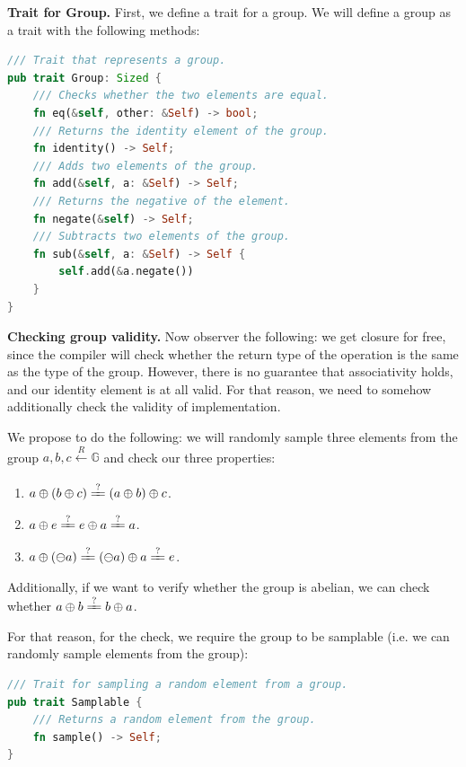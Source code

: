 \documentclass[../lecture-notes.tex]{subfiles}
\begin{document}
\textbf{Trait for Group.} First, we define a trait for a group. We will define a group as a trait with the following methods:
\begin{lstlisting}[language=Rust]
/// Trait that represents a group.
pub trait Group: Sized {
    /// Checks whether the two elements are equal.
    fn eq(&self, other: &Self) -> bool;
    /// Returns the identity element of the group.
    fn identity() -> Self;
    /// Adds two elements of the group.
    fn add(&self, a: &Self) -> Self;
    /// Returns the negative of the element.
    fn negate(&self) -> Self;
    /// Subtracts two elements of the group.
    fn sub(&self, a: &Self) -> Self {
        self.add(&a.negate())
    }
}
\end{lstlisting}

\textbf{Checking group validity.} Now observer the following: we get closure for free, since the compiler will check whether the return type of the operation is the same as the type of the group. 
However, there is no guarantee that associativity holds, and our identity element is at all valid. For that reason, we need to somehow additionally check the
validity of implementation.

We propose to do the following: we will randomly sample three elements from the group $a,b,c \xleftarrow[]{R} \mathbb{G}$ and check our three properties:
\begin{enumerate}
    \item $a \oplus (b \oplus c) \xlongequal{?} (a \oplus b) \oplus c$.
    \item $a \oplus e \xlongequal{?} e \oplus a \xlongequal{?} a $.
    \item $a \oplus (\ominus a) \xlongequal{?} (\ominus a) \oplus a \xlongequal{?} e$.
\end{enumerate}

Additionally, if we want to verify whether the group is abelian, we can check whether $a \oplus b \xlongequal{?} b \oplus a$. 

For that reason, for the check, we require the group to be samplable (i.e. we can randomly sample elements from the group):
\begin{lstlisting}[language=Rust]
/// Trait for sampling a random element from a group.
pub trait Samplable {
    /// Returns a random element from the group.
    fn sample() -> Self;
}
\end{lstlisting}
\end{document}
